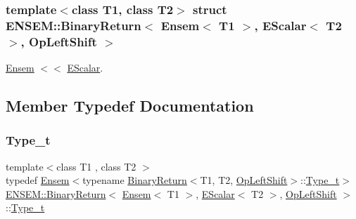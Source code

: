 \subsubsection*{template$<$class T1, class T2$>$\newline
struct E\+N\+S\+E\+M\+::\+Binary\+Return$<$ Ensem$<$ T1 $>$, E\+Scalar$<$ T2 $>$, Op\+Left\+Shift $>$}

\mbox{\hyperlink{classENSEM_1_1Ensem}{Ensem}} $<$$<$ \mbox{\hyperlink{classENSEM_1_1EScalar}{E\+Scalar}}. 

\subsection{Member Typedef Documentation}
\mbox{\label{structENSEM_1_1BinaryReturn_3_01Ensem_3_01T1_01_4_00_01EScalar_3_01T2_01_4_00_01OpLeftShift_01_4_a5e6b49adaeee5d35d0f6e6065d277e16}} 
\subsubsection{\texorpdfstring{Type\_t}{Type\_t}\hspace{0.1cm}{\footnotesize\ttfamily [1/2]}}
{\footnotesize\ttfamily template$<$class T1 , class T2 $>$ \\
typedef \mbox{\hyperlink{classENSEM_1_1Ensem}{Ensem}}$<$typename \mbox{\hyperlink{structENSEM_1_1BinaryReturn}{Binary\+Return}}$<$T1, T2, \mbox{\hyperlink{structENSEM_1_1OpLeftShift}{Op\+Left\+Shift}}$>$\+::\mbox{\hyperlink{structENSEM_1_1BinaryReturn_3_01Ensem_3_01T1_01_4_00_01EScalar_3_01T2_01_4_00_01OpLeftShift_01_4_a5e6b49adaeee5d35d0f6e6065d277e16}{Type\+\_\+t}}$>$ \mbox{\hyperlink{structENSEM_1_1BinaryReturn}{E\+N\+S\+E\+M\+::\+Binary\+Return}}$<$ \mbox{\hyperlink{classENSEM_1_1Ensem}{Ensem}}$<$ T1 $>$, \mbox{\hyperlink{classENSEM_1_1EScalar}{E\+Scalar}}$<$ T2 $>$, \mbox{\hyperlink{structENSEM_1_1OpLeftShift}{Op\+Left\+Shift}} $>$\+::\mbox{\hyperlink{structENSEM_1_1BinaryReturn_3_01Ensem_3_01T1_01_4_00_01EScalar_3_01T2_01_4_00_01OpLeftShift_01_4_a5e6b49adaeee5d35d0f6e6065d277e16}{Type\+\_\+t}}}

